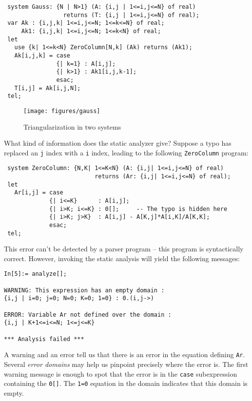 \begin{verbatim}
 system Gauss: {N | N>1} (A: {i,j | 1<=i,j<=N} of real)
                 returns (T: {i,j | 1<=i,j<=N} of real);
 var Ak : {i,j,k| 1<=i,j<=N; 1<=k<=N} of real;
     Ak1: {i,j,k| 1<=i,j<=N; 1<=k<N} of real;
 let
   use {k| 1<=k<N} ZeroColumn[N,k] (Ak) returns (Ak1);
   Ak[i,j,k] = case
               {| k=1} : A[i,j];
               {| k>1} : Ak1[i,j,k-1];
               esac;
   T[i,j] = Ak[i,j,N];
 tel;
\end{verbatim} 

\begin{figure}
\centerline{
	\texttt{[image: figures/gauss]}
        }
\label{gauss-slices}
\caption{Triangularization in two systems}
\end{figure}



What kind of information does the static analyzer give? Suppose a typo
has replaced an \texttt{j} index with a \texttt{i} index, leading to
the following \texttt{ZeroColumn} program:

\begin{verbatim}
 system ZeroColumn: {N,K| 1<=K<N} (A: {i,j| 1<=i,j<=N} of real)
                          returns (Ar: {i,j| 1<=i,j<=N} of real);
 let
   Ar[i,j] = case
             {| i<=K}      : A[i,j];
             {| i>K; i<=K} : 0[];     -- The typo is hidden here
             {| i>K; j>K}  : A[i,j] - A[K,j]*A[i,K]/A[K,K];
             esac;
 tel;
\end{verbatim} 

This error can't be detected by a parser program -- this program is
syntactically correct. However, invoking the static analysis will
yield the following messages:

\begin{verbatim}
In[5]:= analyze[];
 
WARNING: This expression has an empty domain :
{i,j | i=0; j=0; N=0; K=0; 1=0} : 0.(i,j->)
 
ERROR: Variable Ar not defined over the domain :
{i,j | K+1<=i<=N; 1<=j<=K}
 
*** Analysis failed ***
\end{verbatim}

A warning and an error tell us that there is an error in the equation
defining \texttt{Ar}. Several \emph{error domains} may help us pinpoint
precisely where the error is. The first warning message is enough
to spot that the error is in the \texttt{case} subexpression
containing the \texttt{0[]}. The \texttt{1=0} equation in the domain
indicates that this domain is empty.

